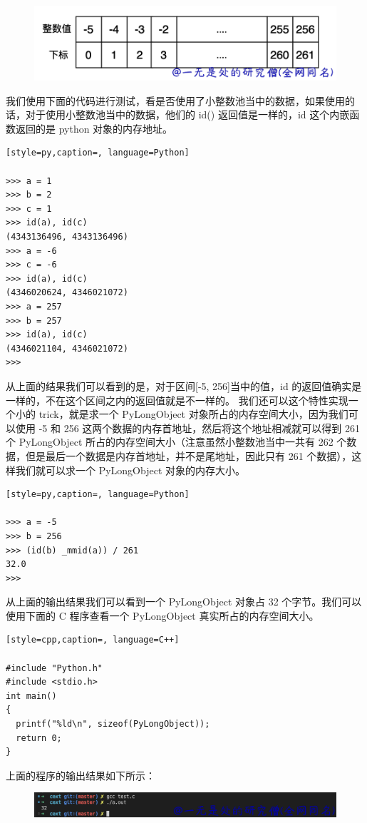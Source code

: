     \begin{figure}[H]
        \centering
            \includegraphics[scale=.3]{images/20-int.png}
            \caption{ }
        \label{fig:my_label}
    \end{figure}
    
我们使用下面的代码进行测试，看是否使用了小整数池当中的数据，如果使用的话，对于使用小整数池当中的数据，他们的 id() 返回值是一样的，id 这个内嵌函数返回的是 python 对象的内存地址。
\begin{lstlisting}[style=py,caption=, language=Python]

>>> a = 1
>>> b = 2
>>> c = 1
>>> id(a), id(c)
(4343136496, 4343136496)
>>> a = -6
>>> c = -6
>>> id(a), id(c)
(4346020624, 4346021072)
>>> a = 257
>>> b = 257
>>> id(a), id(c)
(4346021104, 4346021072)
>>>
\end{lstlisting}
从上面的结果我们可以看到的是，对于区间[-5, 256]当中的值，id 的返回值确实是一样的，不在这个区间之内的返回值就是不一样的。
我们还可以这个特性实现一个小的 trick，就是求一个 PyLongObject 对象所占的内存空间大小，因为我们可以使用 -5 和 256 这两个数据的内存首地址，然后将这个地址相减就可以得到 261 个 PyLongObject 所占的内存空间大小（注意虽然小整数池当中一共有 262 个数据，但是最后一个数据是内存首地址，并不是尾地址，因此只有 261 个数据），这样我们就可以求一个 PyLongObject 对象的内存大小。
\begin{lstlisting}[style=py,caption=, language=Python]

>>> a = -5
>>> b = 256
>>> (id(b) _mmid(a)) / 261 
32.0
>>>
\end{lstlisting}
从上面的输出结果我们可以看到一个 PyLongObject 对象占 32 个字节。我们可以使用下面的 C 程序查看一个 PyLongObject 真实所占的内存空间大小。
\begin{lstlisting}[style=cpp,caption=, language=C++]

#include "Python.h"
#include <stdio.h>
int main()
{
  printf("%ld\n", sizeof(PyLongObject));
  return 0;
}
\end{lstlisting}
上面的程序的输出结果如下所示：

    \begin{figure}[H]
        \centering
            \includegraphics[scale=.2]{images/21-int.png}
            \caption{ }
        \label{fig:my_label}
    \end{figure}
    
